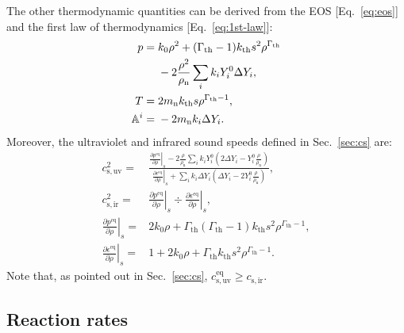 \documentclass[aps,prd,twocolumn,a4paper,floatfix,nofootbib,superscriptaddress,nofootinbib]{revtex4}
\newcommand{\rth}{\mathrm{th}}
\newcommand{\rn}{\mathrm{n}}
\newcommand{\req}{\mathrm{eq}}
\begin{document}
The other thermodynamic quantities can be derived
from the EOS [Eq.~\eqref{eq:eos}] and the first law of thermodynamics
[Eq.~\eqref{eq:1st-law}]:
%
\begin{align}
p={}&k_0\rho^2+ (\Gamma_\rth-1)k_\rth s^2\rho^{\Gamma_\rth} \notag\\
&{}- 2\frac{\rho^2}{\rho_\rn}\sum_i k_i Y_i^0 \Delta Y_i,\\
T={}& 2m_\rn k_\rth s \rho^{\Gamma_\rth-1},\\
\mathbb A^i={}&{}-2m_\rn k_i\Delta Y_i.
\end{align}
%
Moreover, the ultraviolet and infrared sound speeds defined in Sec.~\ref{sec:cs} are:
%
\begin{align}
c_\mathrm{s,uv}^2={}&\frac{\left.\frac{\partial p^\req}{\partial\rho}\right|_s
-2\frac{\rho}{\rho_\rn}\sum_ik_iY_i^0\left(2\Delta Y_i- Y_i^0\frac{\rho}{\rho_\rn}\right)}
{\left.\frac{\partial\epsilon^\req}{\partial\rho}\right|_s
+\sum_i k_i \Delta Y_i\left(\Delta Y_i - 2 Y_i^0 \frac{\rho}{\rho_\rn}\right)},\\
c_\mathrm{s,ir}^2={}&\left.\frac{\partial p^\req}{\partial\rho}\right|_s\div
\left.\frac{\partial\epsilon^\req}{\partial\rho}\right|_s,\\
\left.\frac{\partial p^\req}{\partial\rho}\right|_s={}&{}2k_0\rho+\Gamma_\rth(\Gamma_\rth-1)k_\rth s^2\rho^{\Gamma_\rth-1},\\
\left.\frac{\partial\epsilon^\req}{\partial\rho}\right|_s={}&{}1+2k_0\rho+\Gamma_\rth k_\rth s^2\rho^{\Gamma_\rth-1}.
\end{align}
%
Note that, as pointed out in Sec.~\ref{sec:cs}, $c_\mathrm{s,uv}^\req \geq c_\mathrm{s,ir}$.

\subsection{Reaction rates}
\label{ssec:rates}
\end{document}
